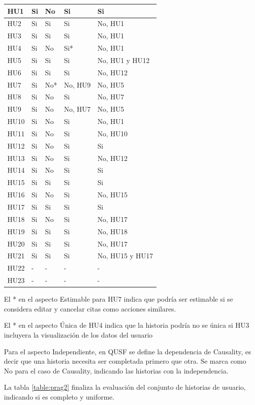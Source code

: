 \begin{longtable}{|l|p{2.7cm}|p{2cm}|p{2cm}|p{2.25cm}|}
HU1 & Si & No & Si  & Si \\ \hline
HU2 & Si & Si & Si & No, HU1 \\ \hline
HU3 & Si & Si & Si & No, HU1  \\ \hline
HU4 & Si & No & Si* & No, HU1  \\ \hline
HU5 & Si & Si & Si &  No, HU1 y HU12  \\ \hline
HU6 & Si & Si & Si &  No, HU12  \\ \hline
HU7 & Si & No* & No, HU9 & No, HU5   \\ \hline
HU8 & Si & No & Si &  No, HU7  \\ \hline
HU9 & Si & No & No, HU7 & No, HU5  \\ \hline
HU10 & Si & No & Si &  No, HU1  \\ \hline
HU11 & Si & No & Si &  No, HU10  \\ \hline
HU12 & Si & No & Si & Si  \\ \hline
HU13 & Si & No & Si & No, HU12   \\ \hline
HU14 & Si & No & Si & Si  \\ \hline
HU15 & Si & Si & Si & Si \\ \hline
HU16 & Si & No & Si & No, HU15  \\ \hline
HU17 & Si & Si & Si & Si   \\ \hline
HU18 & Si & No & Si & No, HU17   \\ \hline
HU19 & Si & Si & Si & No, HU18   \\ \hline
HU20 & Si & Si & Si & No, HU17  \\ \hline
HU21 & Si & Si & Si & No, HU15 y HU17   \\ \hline
HU22 & - & - & - & -  \\ \hline
HU23 & - & - & - & -  \\ \hline
\end{longtable}

El * en el aspecto Estimable para HU7 indica que podría ser estimable si se considera editar y cancelar citas como acciones similares.

El * en el aspecto Única de HU4 indica que la historia podría no se única si HU3 incluyera la visualización de los datos del usuario

Para el aspecto Independiente, en QUSF se define la dependencia de Causality, es decir que una historia necesita ser completada primero que otra. Se marca como No para el caso de Causality, indicando las historias con la independencia.

La tabla \ref{table:prag2} finaliza la evaluación del conjunto de historias de usuario, indicando si es completo y uniforme.


